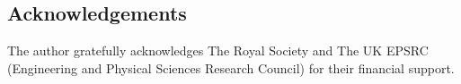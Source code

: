 \documentclass[12pt,a4paper,openany]{report}
\begin{document}
\subsection*{Acknowledgements} 

The author gratefully acknowledges The Royal Society and The UK EPSRC (Engineering and Physical Sciences Research Council) for their financial support. 

 


  

 
\end{document}
